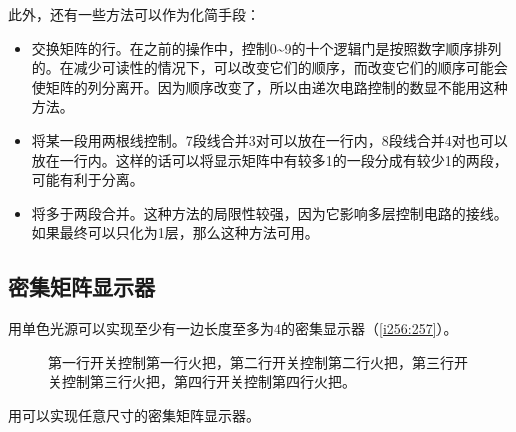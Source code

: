 此外，还有一些方法可以作为化简手段：
\begin{itemize}
\item 交换矩阵的行。在之前的操作中，控制0\~{}9的十个逻辑门是按照数字顺序排列的。在减少可读性的情况下，可以改变它们的顺序，而改变它们的顺序可能会使矩阵的列分离开。因为顺序改变了，所以由递次电路控制的数显不能用这种方法。
\item 将某一段用两根线控制。7段线合并3对可以放在一行内，8段线合并4对也可以放在一行内。这样的话可以将显示矩阵中有较多1的一段分成有较少1的两段，可能有利于分离。
\item 将多于两段合并。这种方法的局限性较强，因为它影响多层控制电路的接线。如果最终可以只化为1层，那么这种方法可用。
\end{itemize}

\subsection{密集矩阵显示器}
用单色光源可以实现至少有一边长度至多为4的密集显示器（\autoref{i256:257}）。

\begin{figure}[!ht]
\begin{center}
\qquad
{}
\end{center}
\caption{第一行开关控制第一行火把，第二行开关控制第二行火把，第三行开关控制第三行火把，第四行开关控制第四行火把。}
\label{i256:257}
\end{figure}

用可以实现任意尺寸的密集矩阵显示器。

